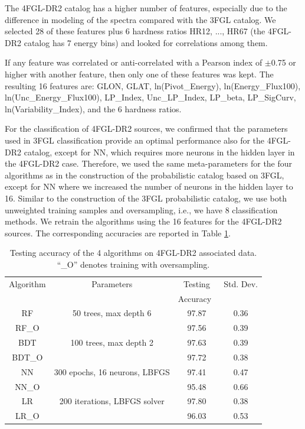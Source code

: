The 4FGL-DR2 catalog has a higher number of features, especially due to the difference in modeling of the spectra compared with the 3FGL catalog. 
We selected 28 of these features plus 6 hardness ratios HR12, ..., HR67 (the 4FGL-DR2 catalog has 7 energy bins)
and looked for correlations among them. 

If any feature was correlated or anti-correlated with a Pearson index of $\pm$0.75 or higher with another feature, then only one of these features was kept. 
The resulting 16 features are:
GLON, GLAT, ln(Pivot\_Energy), ln(Energy\_Flux100), ln(Unc\_Energy\_Flux100), LP\_Index, Unc\_LP\_Index, LP\_beta, LP\_SigCurv, ln(Variability\_Index), and the 6 hardness ratios.

For the classification of 4FGL-DR2 sources, we confirmed that the parameters used in 3FGL classification provide an optimal performance also for the 4FGL-DR2 catalog, except for NN, which requires more neurons in the hidden layer in the 4FGL-DR2 case.
Therefore, we used the same meta-parameters for the four algorithms as in the construction of the probabilistic catalog based on 3FGL, except for NN where we increased the number of neurons in the hidden layer to 16. Similar to the construction of the 3FGL probabilistic catalog, we use both unweighted training samples and oversampling, i.e., we have 8 classification methods.
We retrain the algorithms using the 16 features for the 4FGL-DR2 sources.
The corresponding accuracies are reported in Table \ref{tab:selected_algs2}.



\begin{table}[!h]
\centering
    \tiny
    \renewcommand{\tabcolsep}{0.4mm}
\renewcommand{\arraystretch}{1.6}

    \begin{tabular}{ c c c c }
    \hline
    \hline
    Algorithm&Parameters &  Testing&Std. Dev.\\
    & & Accuracy\ &  \\
    \hline
    RF& 50 trees, max depth 6  &97.87 & 0.36\\
    RF\_O   &&97.56&0.39 \\
    \hline
    BDT & 100 trees, max depth 2    &   97.63 &0.39\\
    BDT\_O&&97.72&0.38\\
    \hline
    NN & 300 epochs, 16 neurons, LBFGS  & 97.41 & 0.47\\
    NN\_O&&95.48&0.66\\
    \hline
    LR & 200 iterations, LBFGS solver & 97.80&0.38\\
    LR\_O&&96.03&0.53\\
    \hline
     
    \end{tabular}%
    \vspace{2mm}
    \caption{Testing accuracy of the 4 algorithms on 4FGL-DR2 associated data. ``\_O'' denotes training with oversampling.}
    \label{tab:selected_algs2}
\end{table}


